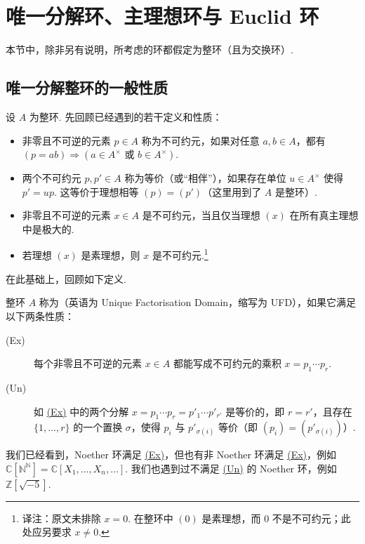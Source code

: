 \section{唯一分解环、主理想环与 Euclid 环}\label{sec:galois-1-5}
本节中，除非另有说明，所考虑的环都假定为整环（且为交换环）.

\subsection{唯一分解整环的一般性质}\label{sec:galois-1-5-1}
设 $A$ 为整环. 先回顾已经遇到的若干定义和性质：
\begin{itemize}
\item 非零且不可逆的元素 $p\in A$ 称为不可约元，如果对任意 $a,b\in A$，都有 $(p=ab)\Rightarrow(a\in A^\times\text{ 或 }b\in A^\times)$.
\item 两个不可约元 $p,p'\in A$ 称为等价（或``相伴''），如果存在单位 $u\in A^\times$ 使得 $p'=up$. 这等价于理想相等 $(p)=(p')$（这里用到了 $A$ 是整环）.
\item 非零且不可逆的元素 $x\in A$ 是不可约元，当且仅当理想 $(x)$ 在所有真主理想中是极大的.
\item 若理想 $(x)$ 是素理想，则 $x$ 是不可约元.\footnote{译注：原文未排除 $x=0$. 在整环中 $(0)$ 是素理想，而 $0$ 不是不可约元；此处应另要求 $x\ne0$.}
\end{itemize}
在此基础上，回顾如下定义.
\begin{definition*}
整环 $A$ 称为（英语为 Unique Factorisation Domain，缩写为 UFD），如果它满足以下两条性质：
\begin{description}
\item[\hypertarget{galois-factorization-ex}{(Ex)}] 每个非零且不可逆的元素 $x\in A$ 都能写成不可约元的乘积 $x=p_1\cdots p_r$.
\item[\hypertarget{galois-factorization-un}{(Un)}] 如 \hyperlink{galois-factorization-ex}{(Ex)} 中的两个分解 $x=p_1\cdots p_r=p'_1\cdots p'_{r'}$ 是等价的，即 $r=r'$，且存在 $\{1,\ldots,r\}$ 的一个置换 $\sigma$，使得 $p_i$ 与 $p'_{\sigma(i)}$ 等价（即 $(p_i)=(p'_{\sigma(i)})$）.
\end{description}
\end{definition*}
我们已经看到，Noether 环满足 \hyperlink{galois-factorization-ex}{(Ex)}，但也有非 Noether 环满足 \hyperlink{galois-factorization-ex}{(Ex)}，例如 $\mathbb C[\mathbb N^{\mathbb N}]=\mathbb C[X_1,\ldots,X_n,\ldots]$. 我们也遇到过不满足 \hyperlink{galois-factorization-un}{(Un)} 的 Noether 环，例如 $\mathbb Z[\sqrt{-5}]$.

